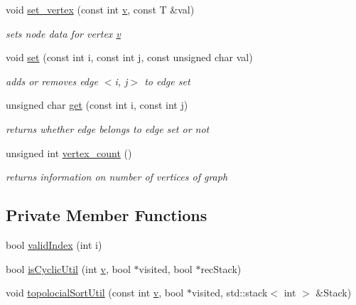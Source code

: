\begin{DoxyCompactItemize}
void \hyperlink{class_graph_a7a7fc33fa15f538eb03bd3fb8671b884}{set\+\_\+vertex} (const int \hyperlink{class_graph_ab2853dc3f4d1684e69319b35952f5b77}{v}, const T \&val)
\begin{DoxyCompactList}\small\item\em sets node data for vertex \hyperlink{class_graph_ab2853dc3f4d1684e69319b35952f5b77}{v} \end{DoxyCompactList}\item 
void \hyperlink{class_graph_a363c8fad867566c72b6c597684d06cba}{set} (const int i, const int j, const unsigned char val)
\begin{DoxyCompactList}\small\item\em adds or removes edge $<$i, j$>$ to edge set \end{DoxyCompactList}\item 
unsigned char \hyperlink{class_graph_a1bb6a20381e0c6aa3f3aa27751bd04e1}{get} (const int i, const int j)
\begin{DoxyCompactList}\small\item\em returns whether edge belongs to edge set or not \end{DoxyCompactList}\item 
unsigned int \hyperlink{class_graph_a97fdbb2378f3a15690156075f6218d23}{vertex\+\_\+count} ()
\begin{DoxyCompactList}\small\item\em returns information on number of vertices of graph \end{DoxyCompactList}\end{DoxyCompactItemize}
\subsection*{Private Member Functions}
\begin{DoxyCompactItemize}
\item 
bool \hyperlink{class_graph_aea4c7543daf12aaf2d06bc15d6306699}{valid\+Index} (int i)
\item 
bool \hyperlink{class_graph_a22f49353a2e338d35d2c9c49f6d1f36a}{is\+Cyclic\+Util} (int \hyperlink{class_graph_ab2853dc3f4d1684e69319b35952f5b77}{v}, bool $\ast$visited, bool $\ast$rec\+Stack)
\item 
void \hyperlink{class_graph_addec6cf734d8cab1f579e806cd5855da}{topolocial\+Sort\+Util} (const int \hyperlink{class_graph_ab2853dc3f4d1684e69319b35952f5b77}{v}, bool $\ast$visited, std\+::stack$<$ int $>$ \&Stack)
\end{DoxyCompactItemize}
